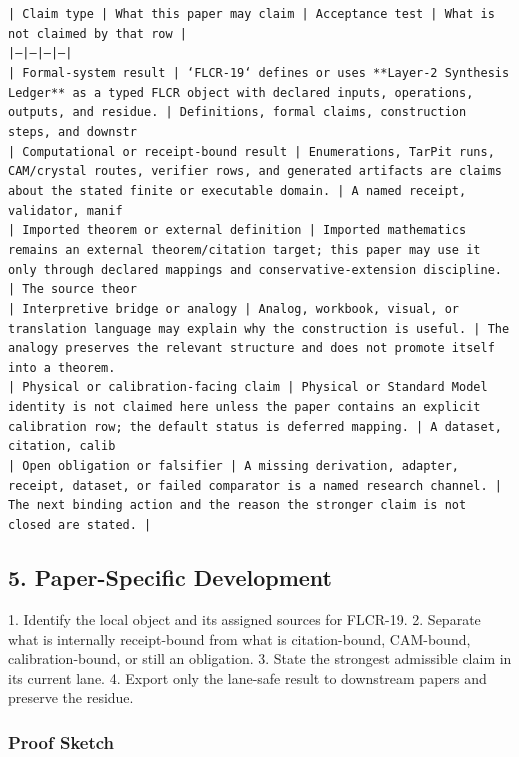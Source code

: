 \documentclass[11pt]{article}
\begin{document}
\noindent\texttt{| Claim type | What this paper may claim | Acceptance test | What is not claimed by that row |}\\
\noindent\texttt{|---|---|---|---|}\\
\noindent\texttt{| Formal-system result | `FLCR-19` defines or uses **Layer-2 Synthesis Ledger** as a typed FLCR object with declared inputs, operations, outputs, and residue. | Definitions, formal claims, construction steps, and downstr}\\
\noindent\texttt{| Computational or receipt-bound result | Enumerations, TarPit runs, CAM/crystal routes, verifier rows, and generated artifacts are claims about the stated finite or executable domain. | A named receipt, validator, manif}\\
\noindent\texttt{| Imported theorem or external definition | Imported mathematics remains an external theorem/citation target; this paper may use it only through declared mappings and conservative-extension discipline. | The source theor}\\
\noindent\texttt{| Interpretive bridge or analogy | Analog, workbook, visual, or translation language may explain why the construction is useful. | The analogy preserves the relevant structure and does not promote itself into a theorem. }\\
\noindent\texttt{| Physical or calibration-facing claim | Physical or Standard Model identity is not claimed here unless the paper contains an explicit calibration row; the default status is deferred mapping. | A dataset, citation, calib}\\
\noindent\texttt{| Open obligation or falsifier | A missing derivation, adapter, receipt, dataset, or failed comparator is a named research channel. | The next binding action and the reason the stronger claim is not closed are stated. | }\\

\subsection*{5. Paper-Specific Development}

1. Identify the local object and its assigned sources for FLCR-19.
2. Separate what is internally receipt-bound from what is citation-bound, CAM-bound, calibration-bound, or still an obligation.
3. State the strongest admissible claim in its current lane.
4. Export only the lane-safe result to downstream papers and preserve the residue.

\subsubsection*{Proof Sketch}
\end{document}
